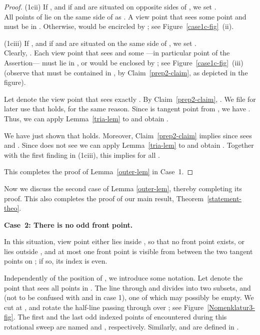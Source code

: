 \documentclass[11pt]{article}
\begin{document}
\begin{proof}
(1cii)  If , and if  and  are situated on opposite sides
of , we set  .\\
All points of  lie on the same side of  as .
A view point  that sees some point  and  must be in .
Otherwise,  would be encircled by ; 
see Figure~\ref{case1c-fig}~(ii).

(1ciii)  If , and if  and  are situated on the same side
of , we set  .\\
Clearly, . Each view point  that sees  and some 
---in particular point  of the Assertion--- must 
lie in , or  would be enclosed by ;
see Figure~\ref{case1c-fig}~(iii) (observe that  must be contained in 
, 
by Claim~\ref{prep2-claim}, as depicted in the figure).

Let  denote the view point that sees exactly . By Claim~\ref{prep2-claim},
.
We file for later use that  holds, for the same reason.
Since  is tangent point from , we have . Thus, we
can apply Lemma~\ref{tria-lem} to  and obtain
. 

We have just shown that  holds. Moreover,
Claim~\ref{prep2-claim} implies 
since  sees  and . Since  does not see  
we can apply Lemma~\ref{tria-lem} to  and obtain .
Together with the first finding in (1ciii), this implies
 for all .

This completes the proof of Lemma~\ref{outer-lem} in Case~1.

\end{proof}
Now we discuss the second case of Lemma \ref{outer-lem}, thereby completing its proof.
This also completes the proof of our main result, Theorem~\ref{statement-theo}.

\bigskip

{\bf Case~2: There is no odd front point.}

In this situation, view point  either lies inside , so that no front point exists, or  lies outside ,
and at most one front point is visible from  between the two tangent points on ; if so, its index is even. 

Independently of the position of ,  we introduce some notation.
Let  denote the point that sees all points in . 
The line  through  and  divides
 into two subsets,  and  (not to be confused with  and  in case 1), one of which may possibly be empty.
We cut  at , and rotate the half-line passing through  over ; see
Figure~\ref{Nomenklatur3-fig}. The first and the last odd indexed points of  encountered
during this rotational sweep are named  and , respectively. 
Similarly,  and  are defined in .
\end{document}
